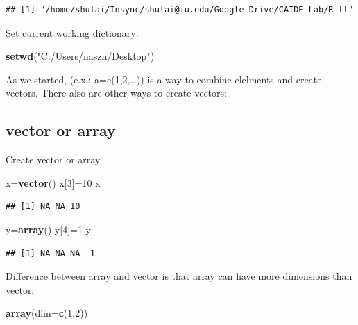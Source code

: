 \documentclass[]{article}
\newenvironment{Shaded}{\begin{snugshade}}{\end{snugshade}}
\newcommand{\DataTypeTok}[1]{\textcolor[rgb]{0.13,0.29,0.53}{#1}}
\newcommand{\DecValTok}[1]{\textcolor[rgb]{0.00,0.00,0.81}{#1}}
\newcommand{\KeywordTok}[1]{\textcolor[rgb]{0.13,0.29,0.53}{\textbf{#1}}}
\newcommand{\NormalTok}[1]{#1}
\newcommand{\StringTok}[1]{\textcolor[rgb]{0.31,0.60,0.02}{#1}}
\begin{document}
\begin{verbatim}
## [1] "/home/shulai/Insync/shulai@iu.edu/Google Drive/CAIDE Lab/R-tt"
\end{verbatim}

Set current working dictionary:

\begin{Shaded}
\begin{Highlighting}[]
\KeywordTok{setwd}\NormalTok{(}\StringTok{"C:/Users/naszh/Desktop"}\NormalTok{)}
\end{Highlighting}
\end{Shaded}

As we started, (e.x.: a=c(1,2,\ldots{})) is a way to combine elelments
and create vectors. There also are other ways to create vectors:

\hypertarget{vector-or-array}{%
\subsection{vector or array}\label{vector-or-array}}

Create vector or array

\begin{Shaded}
\begin{Highlighting}[]
\NormalTok{x=}\KeywordTok{vector}\NormalTok{()}
\NormalTok{x[}\DecValTok{3}\NormalTok{]=}\DecValTok{10}
\NormalTok{x}
\end{Highlighting}
\end{Shaded}

\begin{verbatim}
## [1] NA NA 10
\end{verbatim}

\begin{Shaded}
\begin{Highlighting}[]
\NormalTok{y=}\KeywordTok{array}\NormalTok{()}
\NormalTok{y[}\DecValTok{4}\NormalTok{]=}\DecValTok{1}
\NormalTok{y}
\end{Highlighting}
\end{Shaded}

\begin{verbatim}
## [1] NA NA NA  1
\end{verbatim}

Difference between array and vector is that array can have more
dimensions than vector:

\begin{Shaded}
\begin{Highlighting}[]
\KeywordTok{array}\NormalTok{(}\DataTypeTok{dim=}\KeywordTok{c}\NormalTok{(}\DecValTok{1}\NormalTok{,}\DecValTok{2}\NormalTok{))}
\end{Highlighting}
\end{Shaded}
\end{document}

